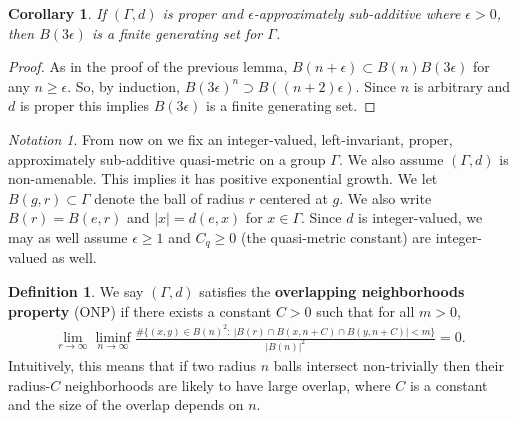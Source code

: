 \documentclass[12pt]{article}
\theoremstyle{plain}
\newtheorem{cor}[thm]{Corollary}
\theoremstyle{definition}
\newtheorem{defn}{Definition}
\theoremstyle{remark}
\newtheorem{notation}{Notation}
\newcommand{\G}{\Gamma}
\newcommand{\eps}{\epsilon}
\begin{document}
\begin{cor}\label{C:generating}
    If $(\G,d)$ is proper and $\eps$-approximately sub-additive where $\eps>0$, then $B(3\eps)$ is a finite generating set for $\G$. %
\end{cor}

\begin{proof}
As in the proof of the previous lemma, $B(n+\eps) \subset B(n)B(3\eps)$ for any $n\ge \eps$. So, by induction, $B(3\eps)^n \supset B((n+2)\eps)$. Since $n$ is arbitrary and $d$ is proper this implies $B(3\eps)$ is a finite generating set.
\end{proof}

\begin{notation}
   From now on we fix an integer-valued, left-invariant, proper, approximately sub-additive quasi-metric on a group $\G$. We also assume $(\G,d)$ is non-amenable. This implies it has positive exponential growth. We let $B(g,r)\subset \G$ denote the ball of radius $r$ centered at $g$. We also write $B(r)=B(e,r)$ and $|x|=d(e,x)$ for $x\in \G$. Since $d$ is integer-valued, we may as well assume $\eps \ge 1$ and $C_q\ge 0$ (the quasi-metric constant) are integer-valued as well.    
\end{notation}


\begin{defn}\label{D:onp}
    We say $(\G,d)$ satisfies the {\bf overlapping neighborhoods property} (ONP) if there exists a constant $C>0$ such that for all $m>0$, %
    \begin{align}\label{E:ONP}
\lim_{r\to\infty} \liminf_{n\to\infty}  \frac{\#\{(x,y) \in B(n)^2:~|B(r) \cap B(x,n+C) \cap B(y,n+C)| < m\}}{|B(n)|^2} =0.
\end{align}
Intuitively, this means that if two radius $n$ balls intersect non-trivially then their radius-$C$ neighborhoods are likely to have large overlap, where $C$ is a constant and the size of the overlap depends on $n$. 
\end{defn}
\end{document}
